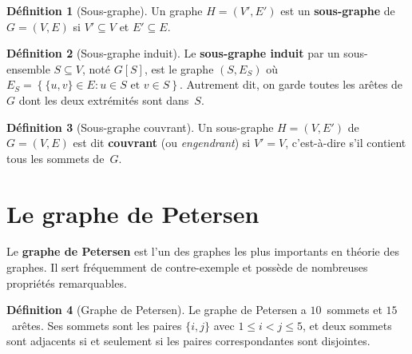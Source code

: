 \documentclass[12pt,a4paper,openany]{book}
\theoremstyle{definition}
\newtheorem{definition}{Définition}[chapter]
\theoremstyle{plain}
\theoremstyle{remark}
\newcommand{\set}[1]{\left\{#1\right\}}
\begin{document}
\begin{definition}[Sous-graphe]
\label{def:sous-graphe}
Un graphe $H = (V', E')$ est un \textbf{sous-graphe} de $G = (V, E)$ si
$V' \subseteq V$ et $E' \subseteq E$.
\end{definition}

\begin{definition}[Sous-graphe induit]
\label{def:sous-graphe-induit}
Le \textbf{sous-graphe induit} par un sous-ensemble $S \subseteq V$, noté
$G[S]$, est le graphe $(S, E_S)$ où
$E_S = \set{\{u,v\} \in E : u \in S \text{ et } v \in S}$.
Autrement dit, on garde toutes les arêtes de~$G$ dont les deux extrémités
sont dans~$S$.
\end{definition}

\begin{definition}[Sous-graphe couvrant]
\label{def:sous-graphe-couvrant}
Un sous-graphe $H = (V, E')$ de $G = (V, E)$ est dit \textbf{couvrant}
(ou \emph{engendrant}) si $V' = V$, c'est-à-dire s'il contient tous les
sommets de~$G$.
\end{definition}

\section{Le graphe de Petersen}
\label{sec:petersen}

Le \textbf{graphe de Petersen} est l'un des graphes les plus importants en
théorie des graphes. Il sert fréquemment de contre-exemple et possède de
nombreuses propriétés remarquables.

\begin{definition}[Graphe de Petersen]
\label{def:petersen}
Le graphe de Petersen a $10$~sommets et $15$~arêtes. Ses sommets sont les
paires $\{i,j\}$ avec $1 \leq i < j \leq 5$, et deux sommets sont adjacents
si et seulement si les paires correspondantes sont disjointes.
\end{definition}

\begin{center}
\label{fig:petersen}
\end{center}
\end{document}
